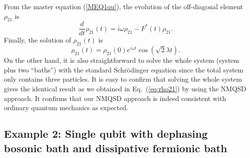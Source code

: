 \documentclass[preprint]{elsarticle}
\begin{document}
From the master equation (\ref{MEQ1qu}), the evolution of the off-diagonal
element $\rho_{21}$ is
\begin{equation}
\frac{d}{dt}\rho_{21}(t)=i\omega\rho_{21}-F^{*}(t)\rho_{21}.
\end{equation}
Finally, the solution of $\rho_{21}(t)$ is 
\begin{equation}
\rho_{21}(t)=\rho_{21}(0)e^{i\omega t}\cos(\sqrt{2}\lambda t).\label{eq:rho21}
\end{equation}
On the other hand, it is also straightforward to solve the whole system (system plus two ``baths'') with the standard Schr\"{o}dinger equation since 
the total system 
only contains three particles. It is easy to confirm that
solving the whole system gives the identical result as we
obtained in Eq.~(\ref{eq:rho21}) by using the NMQSD approach. It confirms that our NMQSD
approach is indeed consistent with ordinary quantum mechanics as expected.


\subsection{Example 2: Single qubit with dephasing bosonic bath and dissipative
fermionic bath}
\end{document}
